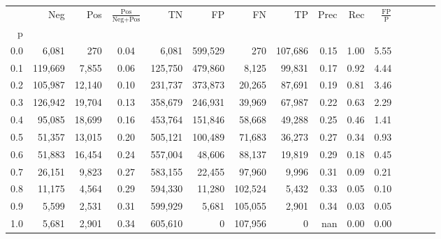 \begin{tabular}{rrrcrrrrrrrrrrr}
\toprule
{} &      Neg &     Pos & $\frac{\text{Pos}}{\text{Neg}+\text{Pos}}$ &       TN &       FP &       FN &       TP &  Prec &   Rec & $\frac{\text{FP}}{\text{P}}$ \\
p   &          &         &                                            &          &          &          &          &       &       &                              \\
\midrule
0.0 &    6,081 &     270 &                                       0.04 &    6,081 &  599,529 &      270 &  107,686 &  0.15 &  1.00 &                         5.55 \\
0.1 &  119,669 &   7,855 &                                       0.06 &  125,750 &  479,860 &    8,125 &   99,831 &  0.17 &  0.92 &                         4.44 \\
0.2 &  105,987 &  12,140 &                                       0.10 &  231,737 &  373,873 &   20,265 &   87,691 &  0.19 &  0.81 &                         3.46 \\
0.3 &  126,942 &  19,704 &                                       0.13 &  358,679 &  246,931 &   39,969 &   67,987 &  0.22 &  0.63 &                         2.29 \\
0.4 &   95,085 &  18,699 &                                       0.16 &  453,764 &  151,846 &   58,668 &   49,288 &  0.25 &  0.46 &                         1.41 \\
0.5 &   51,357 &  13,015 &                                       0.20 &  505,121 &  100,489 &   71,683 &   36,273 &  0.27 &  0.34 &                         0.93 \\
0.6 &   51,883 &  16,454 &                                       0.24 &  557,004 &   48,606 &   88,137 &   19,819 &  0.29 &  0.18 &                         0.45 \\
0.7 &   26,151 &   9,823 &                                       0.27 &  583,155 &   22,455 &   97,960 &    9,996 &  0.31 &  0.09 &                         0.21 \\
0.8 &   11,175 &   4,564 &                                       0.29 &  594,330 &   11,280 &  102,524 &    5,432 &  0.33 &  0.05 &                         0.10 \\
0.9 &    5,599 &   2,531 &                                       0.31 &  599,929 &    5,681 &  105,055 &    2,901 &  0.34 &  0.03 &                         0.05 \\
1.0 &    5,681 &   2,901 &                                       0.34 &  605,610 &        0 &  107,956 &        0 &   nan &  0.00 &                         0.00 \\
\bottomrule
\end{tabular}
